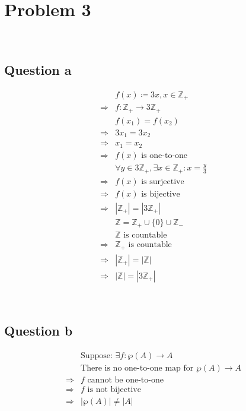 \documentclass{article}
\begin{document}
\newpage

\section*{Problem 3}

~

\subsection*{Question a}

\begin{equation*}
    \begin{split}
        &f(x)\coloneqq 3x,x\in\mathbb{Z}_+\\
        \Rightarrow&f:\mathbb{Z}_+\rightarrow 3\mathbb{Z}_+\\
        &f(x_1)=f(x_2)\\
        \Rightarrow&3x_1=3x_2\\
        \Rightarrow&x_1=x_2\\
        \Rightarrow&f(x)\text{ is one-to-one}\\
        &\forall y\in3\mathbb{Z}_+,\exists x\in\mathbb{Z}_+:x=\frac{y}{3}\\
        \Rightarrow& f(x)\text{ is surjective}\\
        \Rightarrow& f(x)\text{ is bijective}\\
        \Rightarrow& |\mathbb{Z}_+|=|3\mathbb{Z}_+|\\
        &\mathbb{Z}=\mathbb{Z}_+\cup\{0\}\cup\mathbb{Z}_-\\
        &\mathbb{Z}\text{ is countable}\\
        \Rightarrow&\mathbb{Z}_+\text{ is countable}\\
        \Rightarrow&|\mathbb{Z}_+|=|\mathbb{Z}|\\
        \Rightarrow&|\mathbb{Z}|=|3\mathbb{Z}_+|
    \end{split}
\end{equation*}

~

\subsection*{Question b}

\begin{equation*}
    \begin{split}
        &\text{Suppose: }\exists f:\wp (A)\rightarrow A\\
        &\text{There is no one-to-one map for }\wp (A)\rightarrow A\\
        \Rightarrow&f\text{ cannot be one-to-one}\\
        \Rightarrow&f\text{ is not bijective}\\
        \Rightarrow&|\wp(A)|\ne|A|\\
    \end{split}
\end{equation*}
\end{document}
